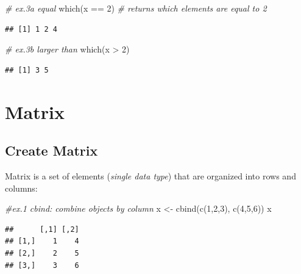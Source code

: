 \documentclass[
]{book}
\newenvironment{Shaded}{\begin{snugshade}}{\end{snugshade}}
\newcommand{\CommentTok}[1]{\textcolor[rgb]{0.56,0.35,0.01}{\textit{#1}}}
\newcommand{\DecValTok}[1]{\textcolor[rgb]{0.00,0.00,0.81}{#1}}
\newcommand{\FunctionTok}[1]{\textcolor[rgb]{0.00,0.00,0.00}{#1}}
\newcommand{\NormalTok}[1]{#1}
\newcommand{\OtherTok}[1]{\textcolor[rgb]{0.56,0.35,0.01}{#1}}
\newcommand{\SpecialCharTok}[1]{\textcolor[rgb]{0.00,0.00,0.00}{#1}}
\begin{document}
\begin{Shaded}
\begin{Highlighting}[]
\CommentTok{\# ex.3a equal}
\FunctionTok{which}\NormalTok{(x }\SpecialCharTok{==} \DecValTok{2}\NormalTok{) }\CommentTok{\# returns which elements are equal to 2}
\end{Highlighting}
\end{Shaded}

\begin{verbatim}
## [1] 1 2 4
\end{verbatim}

\begin{Shaded}
\begin{Highlighting}[]
\CommentTok{\# ex.3b larger than}
\FunctionTok{which}\NormalTok{(x }\SpecialCharTok{\textgreater{}} \DecValTok{2}\NormalTok{)}
\end{Highlighting}
\end{Shaded}

\begin{verbatim}
## [1] 3 5
\end{verbatim}

\hypertarget{matrix}{%
\section{Matrix}\label{matrix}}

\hypertarget{create-matrix}{%
\subsection{Create Matrix}\label{create-matrix}}

Matrix is a set of elements (\emph{single data type}) that are organized into rows and columns:

\begin{Shaded}
\begin{Highlighting}[]
\CommentTok{\#ex.1 cbind: combine objects by column}
\NormalTok{x }\OtherTok{\textless{}{-}} \FunctionTok{cbind}\NormalTok{(}\FunctionTok{c}\NormalTok{(}\DecValTok{1}\NormalTok{,}\DecValTok{2}\NormalTok{,}\DecValTok{3}\NormalTok{), }\FunctionTok{c}\NormalTok{(}\DecValTok{4}\NormalTok{,}\DecValTok{5}\NormalTok{,}\DecValTok{6}\NormalTok{))}
\NormalTok{x}
\end{Highlighting}
\end{Shaded}

\begin{verbatim}
##      [,1] [,2]
## [1,]    1    4
## [2,]    2    5
## [3,]    3    6
\end{verbatim}
\end{document}
